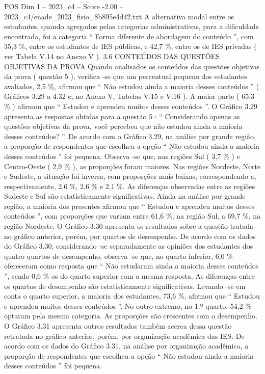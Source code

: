 \begin{textsample}{POS Dim 1 – 2023\_c4 – Score -2.00 – 2023\_c4/enade\_2023\_fisio\_8b895e4d42.txt}
A alternativa modal entre os estudantes, quando agregados pelas categorias administrativas, para a dificuldade encontrada, foi a categoria “ Forma diferente de abordagem do conteúdo ”, com 35,3 \%, entre os estudantes de IES públicas, e 42,7 \%, entre os de IES privadas ( ver Tabela V.14 no Anexo V ). 3.6 CONTEÚDOS DAS QUESTÕES OBJETIVAS DA PROVA Quando analisados os conteúdos das questões objetivas da prova ( questão 5 ), verifica -se que um percentual pequeno dos estudantes avaliados, 2,5 \%, afirmou que “ Não estudou ainda a maioria desses conteúdos ” ( Gráficos 3.29 a 4.32 e, no Anexo V, Tabelas V.15 e V.16 ).
A maior parte ( 65,3 \% ) afirmou que “ Estudou e aprendeu muitos desses conteúdos ”.
O Gráfico 3.29 apresenta as respostas obtidas para a questão 5 : “ Considerando apenas as questões objetivas da prova, você percebeu que não estudou ainda a maioria desses conteúdos? ”.
De acordo com o Gráfico 3.29, na análise por grande região, a proporção de respondentes que escolheu a opção “ Não estudou ainda a maioria desses conteúdos ” foi pequena.
Observa -se que, nas regiões Sul ( 3,7 \% ) e Centro-Oeste ( 2,9 \% ), as proporções foram maiores.
Nas regiões Nordeste, Norte e Sudeste, a situação foi inversa, com proporções mais baixas, correspondendo a, respectivamente, 2,6 \%, 2,6 \% e 2,1 \%.
As diferenças observadas entre as regiões Sudeste e Sul são estatisticamente significativas.
Ainda na análise por grande região, a maioria dos presentes afirmou que “ Estudou e aprendeu muitos desses conteúdos ”, com proporções que variam entre 61,6 \%, na região Sul, a 69,7 \%, na região Nordeste.
O Gráfico 3.30 apresenta os resultados sobre a questão tratada no gráfico anterior, porém, por quartos de desempenho.
De acordo com os dados do Gráfico 3.30, considerando -se separadamente as opiniões dos estudantes dos quatro quartos de desempenho, observa -se que, no quarto inferior, 6,0 \% ofereceram como resposta que “ Não estudaram ainda a maioria desses conteúdos ”, sendo 0,6 \% os do quarto superior com a mesma resposta.
As diferenças entre os quartos de desempenho são estatisticamente significativas.
Levando -se em conta o quarto superior, a maioria dos estudantes, 73,6 \%, afirmou que “ Estudou e aprendeu muitos desses conteúdos ”.
No outro extremo, no 1.º quarto, 54,2 \% optaram pela mesma categoria.
As proporções são crescentes com o desempenho.
O Gráfico 3.31 apresenta outros resultados também acerca dessa questão retratada no gráfico anterior, porém, por organização acadêmica das IES.
De acordo com os dados do Gráfico 3.31, na análise por organização acadêmica, a proporção de respondentes que escolheu a opção “ Não estudou ainda a maioria desses conteúdos ” foi pequena.

\end{textsample}
